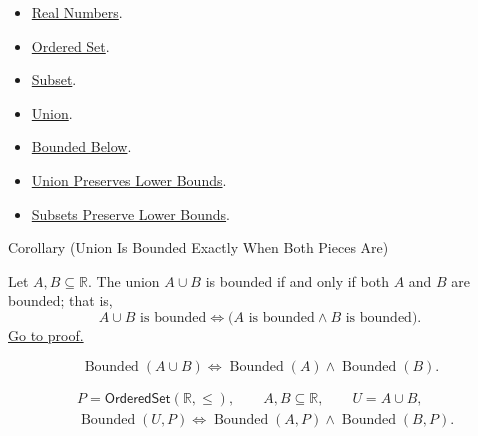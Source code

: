\begin{dependencies}
\begin{itemize}
\item \hyperref[def:reals]{Real Numbers}.
\item \hyperref[def:ordered-set]{Ordered Set}.
\item \hyperref[def:subset]{Subset}.
\item \hyperref[def:union]{Union}.
\item \hyperref[def:bounded-below]{Bounded Below}.
\item \hyperref[lem:union-preserves-lower-bounds]{Union Preserves Lower Bounds}.
\item \hyperref[lem:subsets-preserve-lower-bounds]{Subsets Preserve Lower Bounds}.
\end{itemize}
\end{dependencies}

\begin{corollarybox}{Corollary (Union Is Bounded Exactly When Both Pieces Are)}
\begin{corollary}
\label{cor:union-bounded-iff-pieces-bounded}
Let $A,B\subseteq\mathbb{R}$. The union $A\cup B$ is bounded if and only
if both $A$ and $B$ are bounded; that is,
\[
A\cup B\text{ is bounded}
\Longleftrightarrow
\bigl(A\text{ is bounded}\land B\text{ is bounded}\bigr).
\]
\hyperref[prf:union-bounded-iff-pieces-bounded]{Go to proof.}
\end{corollary}
\end{corollarybox}

\begin{remark*}
\[
\operatorname{Bounded}(A\cup B)
\Longleftrightarrow
\operatorname{Bounded}(A)\land\operatorname{Bounded}(B).
\]
\end{remark*}

\begin{remark*}
\[
\begin{aligned}
&P=\mathsf{OrderedSet}(\mathbb{R},\leq),\qquad A,B\subseteq\mathbb{R},\qquad U=A\cup B,\\
&\operatorname{Bounded}(U,P)
\Longleftrightarrow
\operatorname{Bounded}(A,P)\land\operatorname{Bounded}(B,P).
\end{aligned}
\]
\end{remark*}

